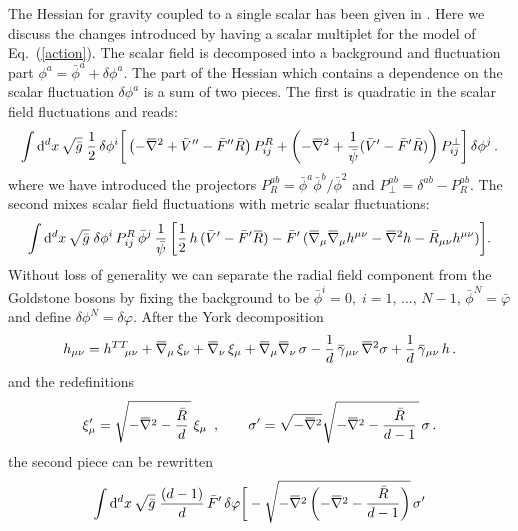 \documentclass[11pt]{book} %
\newcommand{\overbar}[1]{\mkern 1.5mu\overline{\mkern-1.5mu#1\mkern-1.5mu}\mkern 1.5mu}
\newcommand{\bnabla}{\overbar \nabla}
\newcommand{\bR}{\overbar R}
\newcommand{\bg}{\overbar \gamma}
\newcommand{\tth}{{h^{TT}}}
\newcommand{\bphi}{\bar\phi}
\newcommand{\rad}{\psi}
\numberwithin{equation}{chapter}
\begin{document}
\begin{appendices}
The Hessian for gravity coupled to a single scalar has been
given in \cite{Percacci:2015wwa}.
Here we discuss the changes introduced by having a scalar multiplet for the model of Eq.~(\ref{action}).
The scalar field is decomposed into a background and
fluctuation part $\phi^a=\bar{\phi}^a+\delta\phi^a$.
The part of the Hessian which contains a dependence
on the scalar fluctuation $\delta\phi^a$ is a sum of two pieces.
The first is quadratic in the scalar field fluctuations and reads:
\begin{align}
  \int \mathrm d^d x \, \sqrt{\bar{g}} \; \frac{1}{2} \, \delta\phi^i
  \bigg[
    \left(-\bnabla^2
    +\bar V''-\bar F''\bar{R}\right) P^{R}_{ij}
    +\left(-\bnabla^2
    +\frac{1}{\bar\rad}(\bar V'-\bar F'\bar{R})\right) P^{\perp}_{ij}
  \bigg] \, \delta\phi^j \,.
\end{align}
where we have introduced the
projectors $P_R^{ab}=\bphi^a\bphi^b/\bphi^2$
and $P_\perp^{ab} =\delta^{ab}-P_R^{ab}$.
The second mixes scalar field fluctuations with metric scalar fluctuations:
\begin{align}
  \int \mathrm d^d x \, \sqrt{\bar{g}} \;
  \delta\phi^i \, P^{R}_{ij} \, \bar{\phi}^j \,
  \frac{1}{\bar\rad} \,
  \bigg[
    \frac{1}{2} \, h \, (\bar V'-\bar F'\bR)
    - \bar F' \, (\bnabla_\mu \bnabla_\mu h^{\mu\nu} - \bnabla^2 h - \bar{R}_{\mu\nu} h^{\mu\nu})
  \bigg] .
\end{align}
Without loss of generality we can separate the radial field component from the Goldstone bosons
by fixing the background to be
$\bar{\phi}^i = 0,\; i=1,\, \dots,\, N-1$, $\bar{\phi}^N = \bar{\varphi}$
and define $\delta\phi^N = \delta \varphi$.
After the York decomposition
\begin{align}
  h_{\mu\nu} = \tth_{\!\!\mu\nu}
             + \bnabla_\mu \, \xi_\nu
             + \bnabla_\nu \, \xi_\mu
             + \bnabla_\mu \bnabla_\nu \, \sigma
             - \frac{1}{d} \, \bg_{\mu\nu} \, \bnabla^2\sigma
             + \frac{1}{d} \, \bg_{\mu\nu} \, h \,.
  \label{york}
\end{align}
and the redefinitions
\begin{align}
  \xi'_\mu = \sqrt{-\bnabla^2-\frac{\bar R}{d} \, } \, \xi_\mu\ \,,\qquad
  \sigma'  = \sqrt{-\bnabla^2}\sqrt{-\bnabla^2-\frac{\bar R}{d-1} \, } \, \sigma \,.
  \label{redef}
\end{align}
the second piece can be rewritten
\begin{align}
  \int \mathrm{d}^d x \, \sqrt{\bar{g}} \;
  \frac{(d-1)}{d} \, \bar F' \, \delta\varphi
  \bigg[
    &- \sqrt{-\bnabla^2\left(-\bnabla^2-\frac{\bar{R}}{d-1}\right)} \, \sigma' \nonumber \\

\end{align}
\end{appendices}
\end{document}

